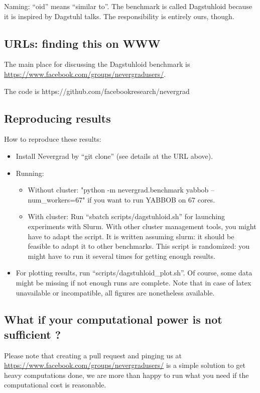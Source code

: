\documentclass{article}
\begin{document}
Naming: “oid” means “similar to”. The benchmark is called Dagstuhloid because it is inspired by Dagstuhl talks. The responsibility is entirely ours, though.

\subsection{URLs: finding this on WWW}
The main place for discussing the Dagstuhloid benchmark is \url{https://www.facebook.com/groups/nevergradusers/}. 

The code is https://github.com/facebookresearch/nevergrad

\subsection{Reproducing results}
How to reproduce these results:
\begin{itemize}
\item Install Nevergrad by “git clone” (see details at the URL above).
\item  Running:
\begin{itemize}
\item Without cluster: "python -m nevergrad.benchmark yabbob --num\_workers=67" if you want to run YABBOB on 67 cores. 
\item With cluster: Run “sbatch scripts/dagstuhloid.sh” for launching experiments with Slurm. With other cluster management tools, you might have to adapt the script. It is written assuming slurm: it should be feasible to adapt it to other benchmarks. This script is randomized: you might have to run it several times for getting enough results.
\end{itemize}
\item For plotting results, run “scripts/dagstuhloid\_plot.sh”. Of course, some data might be missing if not enough runs are complete. Note that in case of latex unavailable or incompatible, all figures are nonetheless available.
\end{itemize}

\subsection{What if your computational power is not sufficient ?}
Please note that creating a pull request and pinging us at \url{https://www.facebook.com/groups/nevergradusers/} is a simple solution to get heavy computations done, we are more than happy to run what you need if the computational cost is reasonable. 
\end{document}
